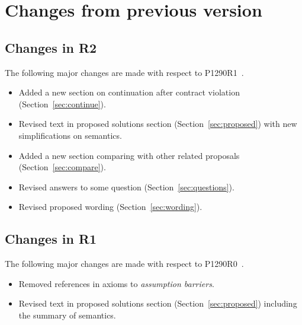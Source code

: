 \section{Changes from previous version}

\subsection{Changes in R2}

The following major changes are made with respect to P1290R1~\cite{p1290r1}.

\begin{itemize}
	\item Added a new section on continuation after contract violation (Section~\ref{sec:continue}).
	\item Revised text in proposed solutions section (Section~\ref{sec:proposed})
		with new simplifications on semantics.
	\item Added a new section comparing with other related proposals (Section~\ref{sec:compare}).
	\item Revised answers to some question (Section~\ref{sec:questions}).
	\item Revised proposed wording (Section~\ref{sec:wording}).
\end{itemize}

\subsection{Changes in R1}

The following major changes are made with respect to P1290R0~\cite{p1290r0}.

\begin{itemize}
  \item Removed references in axioms to \emph{assumption barriers}.
  \item Revised text in proposed solutions section (Section~\ref{sec:proposed})
	including the summary of semantics.
\end{itemize}
